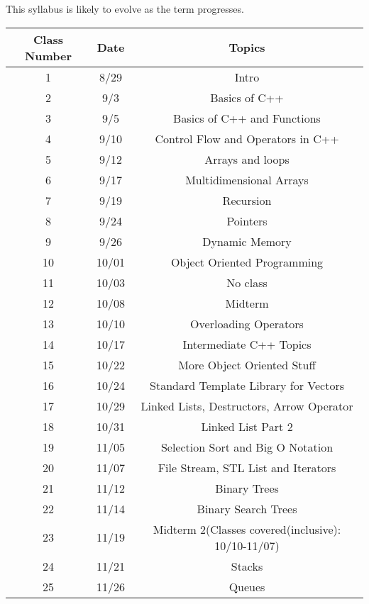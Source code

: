 \documentclass[a4paper]{article}
\begin{document}
This syllabus is likely to evolve as the term progresses.
\begin{center}
    \begin{tabular}{||c c c ||} 
     \hline
     Class Number & Date & Topics  \\ [0.5ex] 
     \hline\hline
     1 & 8/29 & Intro  \\ 
     \hline
     2 & 9/3 & Basics of C++  \\
     \hline
     3 & 9/5 & Basics of C++ and Functions \\
     \hline
     4 & 9/10 & Control Flow and Operators in C++  \\
     \hline
     5 & 9/12 & Arrays and loops \\
     \hline
     6 & 9/17 & Multidimensional Arrays \\
     \hline
     7 & 9/19 & Recursion\\
     \hline
     8 & 9/24 &  Pointers  \\
     \hline
     9 & 9/26 & Dynamic Memory \\ 
     \hline
     10 & 10/01 & Object Oriented Programming  \\
     \hline
     11 & 10/03 & No class \\
     \hline
     12 & 10/08 & Midterm \\ 
     \hline
     13 & 10/10 & Overloading Operators \\ 
     \hline
     14 & 10/17 & Intermediate C++ Topics \\ 
     \hline
     15 & 10/22 & More Object Oriented Stuff \\ 
     \hline
     16 & 10/24 & Standard Template Library for Vectors\\ 
     \hline
     17 & 10/29 & Linked Lists, Destructors, Arrow Operator \\ 
     \hline
     18 & 10/31 & Linked List Part 2 \\ 
     \hline
     19 & 11/05 &  Selection Sort and Big O Notation \\ 
     \hline
     20 & 11/07 & File Stream, STL List and Iterators \\ 
     \hline
     21 & 11/12 &  Binary Trees\\
     \hline
     22 & 11/14 & Binary Search Trees \\ 
     \hline
     23 & 11/19 & Midterm 2(Classes covered(inclusive): 10/10-11/07) \\
     \hline
     24 & 11/21 & Stacks \\ 
     \hline
     25 & 11/26 & Queues \\ [1ex]
     \hline
    \end{tabular}
    \end{center}
\end{document}

